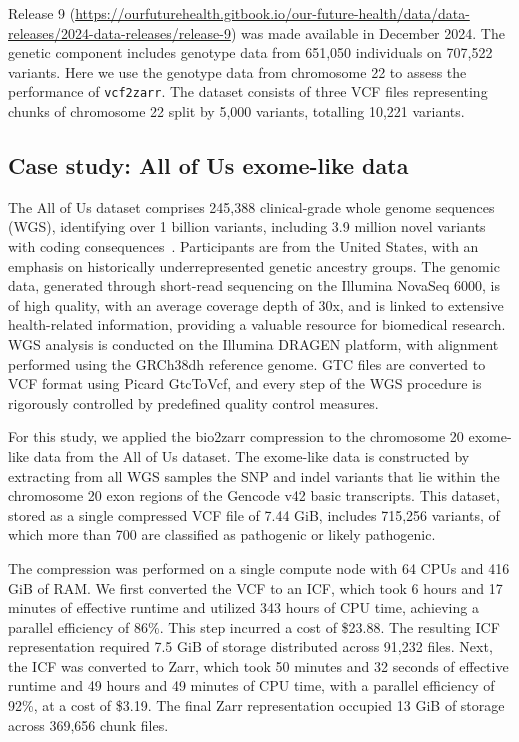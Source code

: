 \documentclass[a4paper,num-refs]{oup-contemporary}
\begin{document}
Release 9 (\url{https://ourfuturehealth.gitbook.io/our-future-health/data/data-releases/2024-data-releases/release-9}) 
was made available in December 2024. The genetic component includes genotype data 
from 651,050 individuals on 707,522 variants. Here we use the genotype data from 
chromosome 22 to assess the performance of \texttt{vcf2zarr}. The dataset consists of
three VCF files representing chunks of chromosome 22 split by 5,000 variants, totalling 
10,221 variants. 

\subsection{Case study: All of Us exome-like data} 
The All of Us dataset comprises 245,388 clinical-grade whole genome sequences (WGS), 
identifying over 1 billion variants, including 3.9 million novel variants 
with coding consequences~\citep{all2024genomic}. Participants are from the United States, 
with an emphasis on historically underrepresented genetic ancestry groups. 
The genomic data, generated through short-read sequencing on the Illumina NovaSeq 6000, 
is of high quality, with an average coverage depth of 30x, and is linked to extensive 
health-related information, providing a valuable resource for biomedical research. 
WGS analysis is conducted on the Illumina DRAGEN platform, with alignment performed 
using the GRCh38dh reference genome. GTC files are converted to VCF format using 
Picard GtcToVcf, and every step of the WGS procedure is rigorously controlled by 
predefined quality control measures.

For this study, we applied the bio2zarr compression to the chromosome 20 exome-like 
data from the All of Us dataset. The exome-like data is constructed by extracting from all WGS samples
the SNP and indel variants that lie within the chromosome 20 exon regions of the Gencode v42 basic 
transcripts. This dataset, stored as a single compressed VCF file of 7.44 GiB, 
includes 715,256 variants, of which more than 700 are classified as pathogenic or likely pathogenic.

The compression was performed on a single compute node with 64 CPUs and 416 GiB of RAM.  
We first converted the VCF to an ICF, which took 6 hours and 17 minutes of  
effective runtime and utilized 343 hours of CPU time, achieving a parallel efficiency of 86\%.  
This step incurred a cost of \$23.88. The resulting ICF representation required 7.5 GiB of storage  
distributed across 91,232 files. Next, the ICF was converted to Zarr, which took 50 minutes and 32 
seconds of effective runtime and 49 hours and 49 minutes of CPU time, with a parallel efficiency of 92\%, 
at a cost of \$3.19. The final Zarr representation occupied 13 GiB of storage across 369,656 chunk files.  
\end{document}
